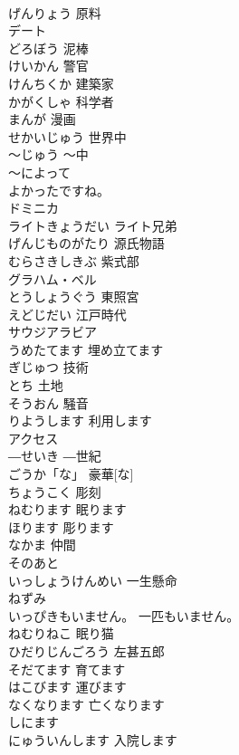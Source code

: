 \documentclass[8pt]{extreport}
\begin{document}
\begin{CJK}{UTF8}{min}
\\	げんりょう	原料	
\\	デート			
\\	どろぼう	泥棒	
\\	けいかん	警官	
\\	けんちくか	建築家	
\\	かがくしゃ	科学者	
\\	まんが	漫画	
\\	せかいじゅう	世界中	
\\	～じゅう	～中	
\\	～によって			
\\	よかったですね。			
\\	ドミニカ			
\\	ライトきょうだい	ライト兄弟	
\\	げんじものがたり	源氏物語	
\\	むらさきしきぶ	紫式部	
\\	グラハム・ベル			
\\	とうしょうぐう	東照宮	
\\	えどじだい	江戸時代	
\\	サウジアラビア			
\\	うめたてます	埋め立てます	
\\	ぎじゅつ	技術	
\\	とち	土地	
\\	そうおん	騒音	
\\	りようします	利用します	
\\	アクセス			
\\	―せいき	―世紀	
\\	ごうか「な」	豪華[な]	
\\	ちょうこく	彫刻	
\\	ねむります	眠ります	
\\	ほります	彫ります	
\\	なかま	仲間	
\\	そのあと			
\\	いっしょうけんめい	一生懸命	
\\	ねずみ			
\\	いっぴきもいません。	一匹もいません。		
\\	ねむりねこ	眠り猫	
\\	ひだりじんごろう	左甚五郎	
\\	そだてます	育てます	
\\	はこびます	運びます	
\\	なくなります	亡くなります	
\\	しにます
\\	にゅういんします	入院します	

\end{CJK}
\end{document}
